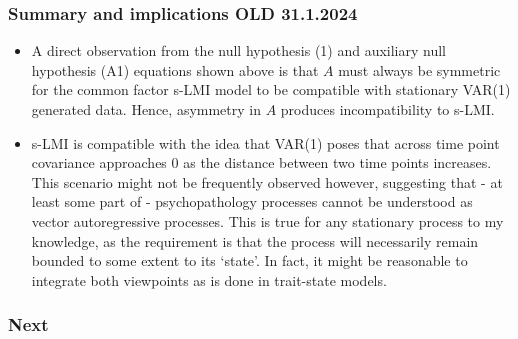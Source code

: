 \documentclass[
  letterpaper,
  DIV=11,
  numbers=noendperiod]{scrartcl}
\begin{document}
\hypertarget{summary-and-implications-old-31.1.2024}{%
\subsubsection{Summary and implications OLD
31.1.2024}\label{summary-and-implications-old-31.1.2024}}

\begin{itemize}
\item
  A direct observation from the null hypothesis (1) and auxiliary null
  hypothesis (A1) equations shown above is that \(A\) must always be
  symmetric for the common factor s-LMI model to be compatible with
  stationary VAR(1) generated data. Hence, asymmetry in \(A\) produces
  incompatibility to s-LMI.
\item
  s-LMI is compatible with the idea that VAR(1) poses that across time
  point covariance approaches 0 as the distance between two time points
  increases. This scenario might not be frequently observed however,
  suggesting that - at least some part of - psychopathology processes
  cannot be understood as vector autoregressive processes. This is true
  for any stationary process to my knowledge, as the requirement is that
  the process will necessarily remain bounded to some extent to its
  `state'. In fact, it might be reasonable to integrate both viewpoints
  as is done in trait-state models.
\end{itemize}

\hypertarget{next}{%
\subsubsection{Next}\label{next}}
\end{document}
